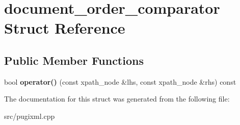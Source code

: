 \hypertarget{structdocument__order__comparator}{}\section{document\+\_\+order\+\_\+comparator Struct Reference}
\label{structdocument__order__comparator}
\subsection*{Public Member Functions}
\begin{DoxyCompactItemize}
\item 
\mbox{\label{structdocument__order__comparator_ad9c64802ceb792edf2c10aaa7530d0a8}} 
bool {\bfseries operator()} (const xpath\+\_\+node \&lhs, const xpath\+\_\+node \&rhs) const
\end{DoxyCompactItemize}


The documentation for this struct was generated from the following file\+:\begin{DoxyCompactItemize}
\item 
src/pugixml.\+cpp\end{DoxyCompactItemize}
